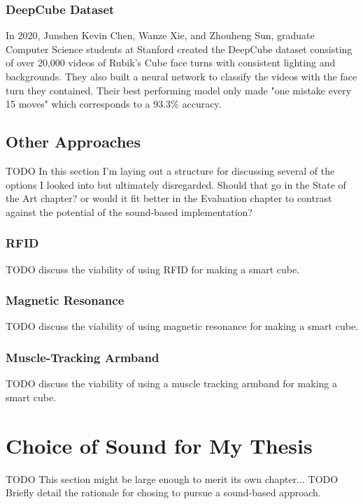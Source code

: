\subsubsection{DeepCube Dataset}
In 2020, Junshen Kevin Chen, Wanze Xie, and Zhouheng Sun, graduate Computer Science students at Stanford created the DeepCube dataset consisting of over 20,000 videos of Rubik's Cube face turns with consistent lighting and backgrounds. 
They also built a neural network to classify the videos with the face turn they contained.
Their best performing model only made "one mistake every 15 moves" which corresponds to a 93.3\% accuracy. \cite{chen-deep-cube-dataset}


\subsection{Other Approaches}

TODO In this section I'm laying out a structure for discussing several of the options I looked into but ultimately disregarded. Should that go in the State of the Art chapter? or would it fit better in the Evaluation chapter to contrast against the potential of the sound-based implementation?

\subsubsection{RFID}
TODO discuss the viability of using RFID for making a smart cube.
\subsubsection{Magnetic Resonance}
TODO discuss the viability of using magnetic resonance for making a smart cube.
\subsubsection{Muscle-Tracking Armband}
TODO discuss the viability of using a muscle tracking armband for making a smart cube.


\section{Choice of Sound for My Thesis}

TODO This section might be large enough to merit its own chapter...
TODO Briefly detail the rationale for chosing to pursue a sound-based approach.